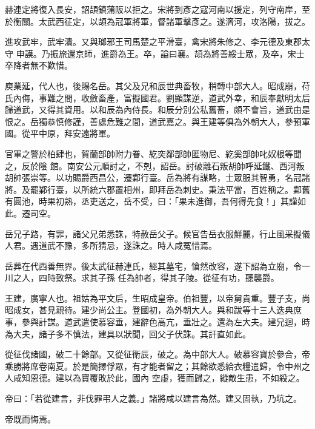 \begin{pinyinscope}
 赫連定將復入長安，詔頡鎮蒲阪以拒之。宋將到彥之寇河南以援定，列守南岸，至於衡關。太武西征定，以頡為冠軍將軍，督諸軍擊彥之。遂濟河，攻洛陽，拔之。



 進攻武牢，武牢潰。又與瑯邪王司馬楚之平滑臺，禽宋將朱修之、李元德及東郡太守
 申謨。乃振旅還京師，進爵為王。卒，謚曰襄。頡為將善綏士眾，及卒，宋士卒降者無不歎惜。



 庾業延，代人也，後賜名岳。其父及兄和辰世典畜牧，稍轉中部大人。昭成崩，苻氏內侮，事難之間，收斂畜產，富擬國君。劉顯謀逆，道武外幸，和辰奉獻明太后歸道武，又得其資用。以和辰為內侍長。和辰分別公私舊畜，頗不會旨，道武由是恨之。岳獨恭慎修謹，善處危難之間，道武嘉之。與王建等俱為外朝大人，參預軍國。從平中原，拜安遠將軍。



 官軍之警於柏肆也，賀蘭部帥附力眷、紇突鄰部帥匿物尼、紇奚部帥叱奴根等聞之，反於陰
 館。南安公元順討之，不剋，詔岳。討破離石叛胡帥呼延鐵、西河叛胡帥張崇等。以功賜爵西昌公，遷鄴行臺。岳為將有謀略，士眾服其智勇，名冠諸將。及罷鄴行臺，以所統六郡置相州，即拜岳為刺史。秉法平當，百姓稱之。鄴舊有圓池，時果初熟，丞吏送之，岳不受，曰：「果未進御，吾何得先食！」其謹如此。遷司空。



 岳兄子路，有罪，諸父兄弟悉誅，特赦岳父子。候官告岳衣服鮮麗，行止風采擬儀人君。遇道武不豫，多所猜忌，遂誅之。時人咸冤惜焉。



 岳葬在代西善無界。後太武征赫連氏，經其墓宅，愴然改容，遂下詔為立廟，令一川之人，四時致祭。求其子孫
 任為帥者，得其子陵。從征有功，聽襲爵。



 王建，廣寧人也。祖姑為平文后，生昭成皇帝。伯祖豐，以帝舅貴重。豐子支，尚昭成女，甚見親待。建少尚公主。登國初，為外朝大人。與和跋等十三人迭典庶事，參與計謀。道武遣使慕容垂，建辭色高亢，垂壯之。還為左大夫。建兄迴，時為大夫，諸子多不慎法，建具以狀聞，回父子伏誅。其訐直如此。



 從征伐諸國，破二十餘部。又從征衛辰，破之。為中部大人。破慕容寶於參合，帝乘勝將席卷南夏。於是簡擇俘眾，有才能者留之；其餘欲悉給衣糧遣歸，令中州之人咸知恩德。建以為寶覆敗於此，國內
 空虛，獲而歸之，縱敵生患，不如殺之。



 帝曰：「若從建言，非伐罪弔人之義。」諸將咸以建言為然。建又固執，乃坑之。



 帝既而悔焉。




\end{pinyinscope}
